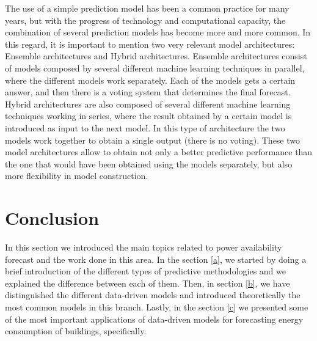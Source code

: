 The use of a simple prediction model has been a common practice for many years, but with the progress of technology and computational capacity, the combination of several prediction models has become more and more common. In this regard, it is important to mention two very relevant model architectures: Ensemble architectures and Hybrid architectures. Ensemble architectures consist of models composed by several different machine learning techniques in parallel, where the different models work separately. Each of the models gets a certain answer, and then there is a voting system that determines the final forecast. Hybrid architectures are also composed of several different machine learning techniques working in series, where the result obtained by a certain model is introduced as input to the next model. In this type of architecture the two models work together to obtain a single output (there is no voting). These two model architectures allow to obtain not only a better predictive performance than the one that would have been obtained using the models separately, but also more flexibility in model construction.


\section{Conclusion}

In this section we introduced the main topics related to power availability forecast and the work done in this area. In the section \ref{a}, we started by doing a brief introduction of the different types of predictive methodologies and we explained the difference between each of them. Then, in section \ref{b}, we have distinguished the different data-driven models and introduced theoretically the most common models in this branch. Lastly, in the section \ref{c} we presented some of the most important applications of data-driven models for forecasting energy consumption of buildings, specifically.
